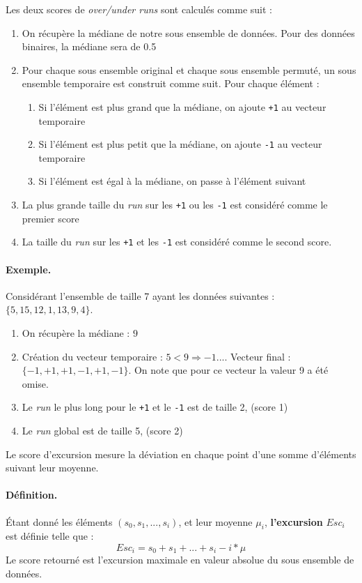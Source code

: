  
Les deux scores de \textit{over/under runs} sont calculés comme suit : 
\begin{enumerate}
\item On récupère la médiane de notre sous ensemble de données. Pour des données binaires, la médiane sera de 0.5
\item Pour chaque sous ensemble original et chaque sous ensemble permuté, un sous ensemble temporaire est construit comme suit. Pour chaque élément : 
	\begin{enumerate}
	\item Si l'élément est plus grand que la médiane, on ajoute \texttt{+1} au vecteur temporaire
 	\item Si l'élément est plus petit que la médiane, on ajoute \texttt{-1} au vecteur temporaire
	\item Si l'élément est égal à la médiane, on passe à l'élément suivant	
	\end{enumerate}
\item La plus grande  taille du \textit{run} sur les \texttt{+1} ou les \texttt{-1} est considéré comme le premier score 
\item La taille du \textit{run} sur les \texttt{+1} et les \texttt{-1} est considéré comme le second score.
\end{enumerate}

\paragraph{Exemple.\\}
Considérant l'ensemble de taille 7 ayant les données suivantes : $\lbrace 5,15,12,1,13,9,4\rbrace$.
\begin{enumerate}
\item  On récupère la médiane : $9$
\item  Création du vecteur temporaire : $5<9 \Rightarrow -1 ...$. Vecteur final : $\lbrace -1, +1,+1,-1,+1,-1 \rbrace$. On note que pour ce vecteur la valeur 9 a été omise.
\item Le \textit{run} le plus long pour le \texttt{+1} et le \texttt{-1} est de taille 2, (score 1)
\item Le \textit{run} global est de taille 5, (score 2)
\end{enumerate}

Le score d'excursion mesure la déviation en chaque point d'une somme d'éléments suivant leur moyenne.

\paragraph{Définition.\\}
 Étant donné les éléments $(s_0,s_1,...,s_i)$, et leur moyenne $\mu_i$,  \textbf{l'excursion} $Esc_i$ est définie telle que :
 $$ Esc_i= s_0+ s_1 + ... + s_i - i*\mu$$ 
Le score retourné est l'excursion maximale en valeur absolue du sous ensemble de données. \\

